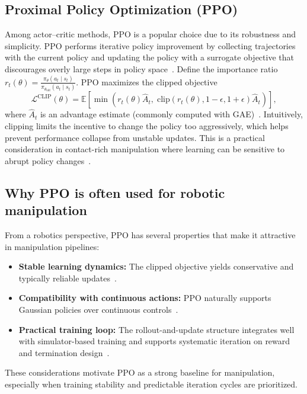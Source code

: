 \subsection{Proximal Policy Optimization (PPO)}
\label{sec:ppo}

Among actor--critic methods, \ac{PPO} is a popular choice due to its robustness and simplicity.
\ac{PPO} performs iterative policy improvement by collecting trajectories with the current policy and updating the policy with a
surrogate objective that discourages overly large steps in policy space~\cite{Schulman2017PPO}.
Define the importance ratio
$r_t(\theta)=\frac{\pi_\theta(a_t\mid s_t)}{\pi_{\theta_{\text{old}}}(a_t\mid s_t)}$.
\ac{PPO} maximizes the clipped objective
\begin{equation}
  \mathcal{L}^{\text{CLIP}}(\theta)=
  \mathbb{E}\left[
    \min\left(
      r_t(\theta)\hat{A}_t,\;
      \text{clip}(r_t(\theta),1-\epsilon,1+\epsilon)\hat{A}_t
    \right)
  \right],
\end{equation}
where $\hat{A}_t$ is an advantage estimate (commonly computed with \ac{GAE})~\cite{Schulman2015GAE,Schulman2017PPO}.
Intuitively, clipping limits the incentive to change the policy too aggressively, which helps prevent performance collapse
from unstable updates. This is a practical consideration in contact-rich manipulation where learning can be sensitive to abrupt
policy changes~\cite{Schulman2017PPO,Kober2013Survey}.

\subsection{Why PPO is often used for robotic manipulation}
\label{sec:ppo_for_manipulation}

From a robotics perspective, \ac{PPO} has several properties that make it attractive in manipulation pipelines:
\begin{itemize}
  \item \textbf{Stable learning dynamics:} The clipped objective yields conservative and typically reliable updates~\cite{Schulman2017PPO}.
  \item \textbf{Compatibility with continuous actions:} \ac{PPO} naturally supports Gaussian policies over continuous controls~\cite{SuttonBarto2018}.
  \item \textbf{Practical training loop:} The rollout-and-update structure integrates well with simulator-based training and
  supports systematic iteration on reward and termination design~\cite{Kober2013Survey}.
\end{itemize}
These considerations motivate \ac{PPO} as a strong baseline for manipulation, especially when training stability and predictable
iteration cycles are prioritized.


